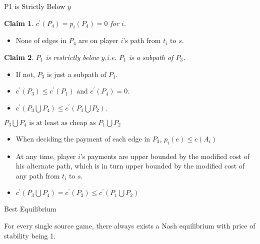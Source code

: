 \documentclass[11pt,aspectratio=169]{beamer}
\newtheorem{claim}{Claim}
\begin{document}
\begin{frame}{P1 is Strictly Below $y$}
    \begin{claim}
        $ c^{'}(P_4) = p_i(P_4) = 0$ for $i$.
    \end{claim}
    \begin{itemize}
        \item None of edges in $P_4$ are on player $i$'s path from $t_i$ to $s$.
    \end{itemize}
    \begin{claim}
    $P_1$ is restrictly below $y$,i.e. $P_1$ is a subpath of $P_3$. 
    \end{claim}
    \begin{itemize}
        \item If not, $P_3$ is just a subpath of $P_1$. 
        \item $c^{'}(P_3) \leq c^{'}(P_1) \text{ and } c^{'}(P_4) = 0$.
        \item $ c^{'}(P_3\bigcup P_4) \leq c^{'}(P_1\bigcup P_2).$ 
    \end{itemize}
\end{frame}

\begin{frame}{$P_3\bigcup P_4 \text{ is at least as cheap as }P_1\bigcup P_2$}
    \begin{itemize}
        \item When deciding the payment of each edge in $P_3$, $p_i(e) \leq c(A_i)$
        \item At any time, player $i$'s payments are upper bounded by the modified cost of his alternate path, which is in turn upper bounded by the modified cost of any path from $t_i$ to $s$. 
        \item $ c^{'}(P_3\bigcup P_4) = c^{'}(P_3) \leq c^{'}(P_1\bigcup P_2)$
    \end{itemize}
\end{frame}

\begin{frame}{Best Equilibrium}
    \begin{theorem}
        For every single source game, there always exists a Nash equilibrium with price of stability being 1.
    \end{theorem}
\end{frame}
\end{document}
